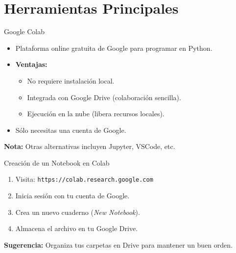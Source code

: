\documentclass[10pt]{beamer}
\begin{document}
\section{Herramientas Principales}

\begin{frame}{Google Colab}
  \begin{itemize}
    \item Plataforma online gratuita de Google para programar en Python.
    \item \textbf{Ventajas:}
      \begin{itemize}
        \item No requiere instalación local.
        \item Integrada con Google Drive (colaboración sencilla).
        \item Ejecución en la nube (libera recursos locales).
      \end{itemize}
    \item Sólo necesitas una cuenta de Google.
  \end{itemize}
  \vspace{0.3cm}
  \textbf{Nota:} Otras alternativas incluyen Jupyter, VSCode, etc.
\end{frame}

\begin{frame}{Creación de un Notebook en Colab}
  \begin{enumerate}
    \item Visita: \texttt{https://colab.research.google.com}
    \item Inicia sesión con tu cuenta de Google.
    \item Crea un nuevo cuaderno (\emph{New Notebook}).
    \item Almacena el archivo en tu Google Drive.
  \end{enumerate}
  \textbf{Sugerencia:} Organiza tus carpetas en Drive para mantener un buen orden.
\end{frame}
\end{document}
